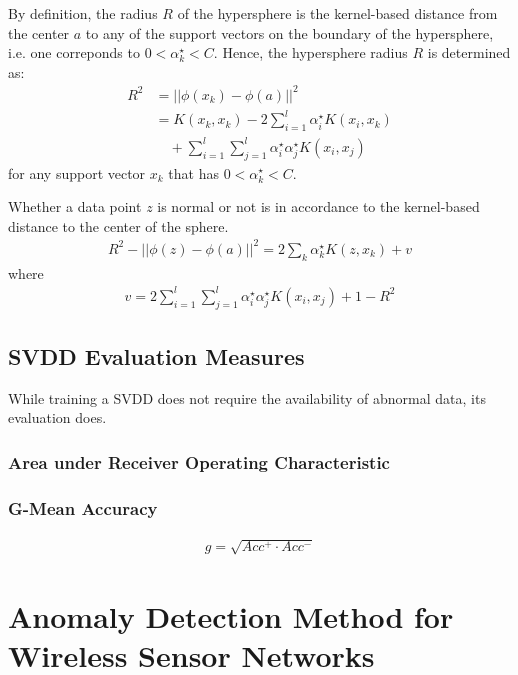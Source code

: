 \documentclass[journal,transmag,times]{IEEEtran}
\begin{document}
By definition, the radius $R$ of the hypersphere is the kernel-based distance from the center $a$ to any of the support vectors on the boundary of the hypersphere, i.e. one correponds to $0< \alpha^\star_k < C$. Hence, the hypersphere radius $R$ is determined as:
\begin{align}
R^2 &= \left|\left| \phi \left( x_k \right) - \phi \left( a \right) \right|\right|^2 \nonumber \\
&= K \left( x_k, x_k \right) - 2 \sum_{i=1}^l \alpha^\star_i K \left( x_i, x_k \right)  
\\
&\quad + \sum_{i=1}^l \sum_{j=1}^l \alpha^\star_i \alpha^\star_j K \left( x_i, x_j \right) \nonumber
\end{align}
for any support vector $x_k$ that has $0 < \alpha^\star_k < C$.

Whether a data point $z$ is normal or not is in accordance to the kernel-based distance to the center of the sphere.
\begin{align}
R^2 - \left|\left| \phi \left( z \right) - \phi \left( a \right) \right|\right|^2 = 2 \sum_k \alpha^\star_k K \left( z, x_k \right) + v
\end{align}
where
\begin{align}
v = 2 \sum_{i=1}^l \sum_{j=1}^l \alpha^\star_i \alpha^\star_j K \left( x_i, x_j \right) + 1 - R^2
\end{align}

\subsection{SVDD Evaluation Measures}

While training a SVDD does not require the availability of abnormal data, its evaluation does. 

\subsubsection{Area under Receiver Operating Characteristic}



\subsubsection{G-Mean Accuracy}

\begin{align}
g = \sqrt{Acc^+ \cdot Acc^-}
\end{align}

\section{Anomaly Detection Method for Wireless Sensor Networks}
\end{document}
